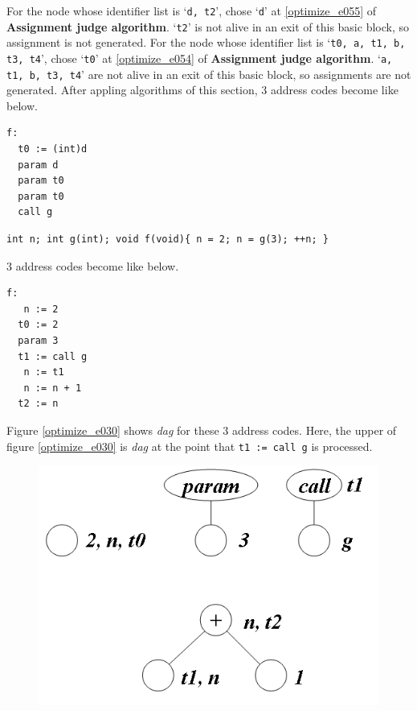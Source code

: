 \begin{Example}
For the node whose identifier list is `{\tt{d, t2}}',
chose `{\tt{d}}' at \ref{optimize_e055} of {\bf Assignment judge
 algorithm}.
`{\tt{t2}}' is not alive in an exit of this basic block, so
assignment is not generated.
For the node whose identifier list is `{\tt{t0, a, t1, b, t3, t4}}',
chose `{\tt{t0}}' at \ref{optimize_e054} of {\bf Assignment judge
 algorithm}.
`{\tt{a, t1, b, t3, t4}}' are not alive in an exit of this basic block, so
assignments are not generated.
After appling algorithms of this section,
3 address codes become like below.
\begin{verbatim}
f:
  t0 := (int)d
  param d
  param t0
  param t0
  call g
\end{verbatim}
\end{Example}

\begin{Example}
\label{optimize_e029}
\begin{verbatim}
int n; int g(int); void f(void){ n = 2; n = g(3); ++n; }
\end{verbatim}
3 address codes become like below.
\begin{verbatim}
f:
   n := 2
  t0 := 2
  param 3
  t1 := call g
   n := t1
   n := n + 1
  t2 := n
\end{verbatim}
Figure \ref{optimize_e030} shows {\em dag} for these 3 address codes.
Here, the upper of figure \ref{optimize_e030} is {\em dag}
at the point that {\tt{t1 := call g}} is processed.
\begin{figure}[htbp]
\begin{center}
\begin{htmlonly}
\includegraphics[width=0.8\linewidth,height=0.571\linewidth]{opt013.png}
\end{htmlonly}
\begin{latexonly}

\end{latexonly}
\end{center}
\end{figure}
\end{Example}
